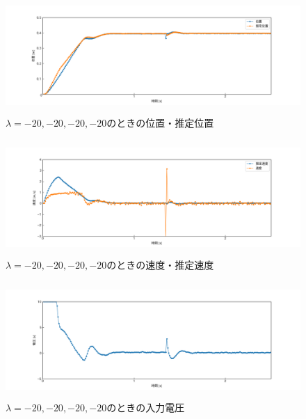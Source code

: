 \documentclass[12pt]{jsarticle}
\begin{document}
\begin{figure}[H]
  \begin{center}
    \includegraphics[clip,width=13.0cm, height=4.4cm]{../img/Exp12-1.png}
    \caption{$\lambda=-20, -20, -20, -20$のときの位置・推定位置}
    \label{Exp12-1}
  \end{center}
\end{figure}
\begin{figure}[H]
  \begin{center}
    \includegraphics[clip,width=13.0cm, height=4.4cm]{../img/Exp12-2.png}
    \caption{$\lambda=-20, -20, -20, -20$のときの速度・推定速度}
    \label{Exp12-2}
  \end{center}
\end{figure}
\begin{figure}[H]
  \begin{center}
    \includegraphics[clip,width=13.0cm, height=4.4cm]{../img/Exp12-3.png}
    \caption{$\lambda=-20, -20, -20, -20$のときの入力電圧}
    \label{Exp12-3}
  \end{center}
\end{figure}
\end{document}
